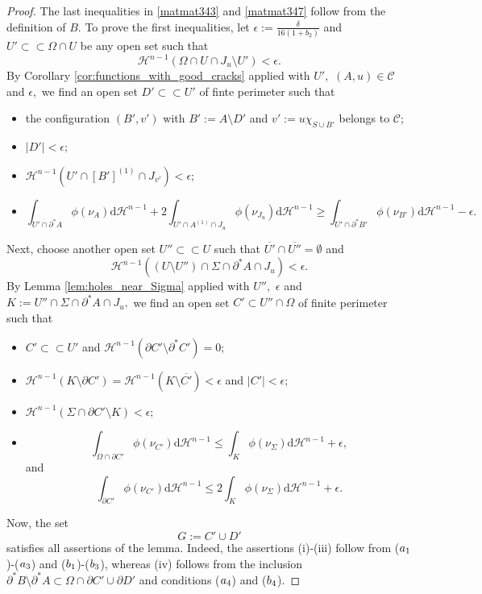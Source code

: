 \documentclass[reqno]{amsart}
\numberwithin{equation}{section}
\theoremstyle{plain}
\theoremstyle{definition}
\newcommand{\cH}{\mathcal{H}}
\newcommand{\p}{\partial}
\newcommand{\cl}[1]{\overline{#1}}
\newcommand{\bound}{b}
\renewcommand{\d}{\mathrm{d}}
\newcommand{\strictlyincluded}{\subset\subset}
\newcommand{\admissible}{\mathcal{C}}
\begin{document}
\begin{proof}
The last inequalities in \eqref{matmat343} and \eqref{matmat347} follow from the definition of $B.$
To prove the first inequalities, let $\epsilon:=\frac{\delta}{16(1+\bound_2)}$ and $U'\strictlyincluded \Omega\cap U$ be any open set such that
\begin{equation*}
\cH^{n-1}(\Omega\cap U\cap J_u\setminus U')<\epsilon.
\end{equation*}
By Corollary \ref{cor:functions_with_good_cracks} applied with $U',$ $(A,u)\in \admissible$ and $\epsilon,$ we find an open set $D'\strictlyincluded U'$ of finte perimeter such that
\begin{itemize}
 \item[($\rm a_1$)] the configuration $(B',v')$ with $B':=A\setminus D'$ and $v':=u\chi_{S\cup B'}$ belongs to $\admissible$;
 
 \item[($\rm a_2$)] $|D'|<\epsilon;$
 \item[($\rm a_3$)] $\cH^{n-1}(U'\cap [B']^{(1)} \cap J_{v'})<\epsilon;$
 \item[($\rm a_4$)] 
 $$
 \int_{U'\cap \p^*A}\phi(\nu_A)\d\cH^{n-1} + 2\int_{U'\cap A^{(1)}\cap J_u}\phi(\nu_{J_u})\d\cH^{n-1}
 \ge \int_{U'\cap \p^*B'}\phi(\nu_{B'})\d\cH^{n-1} -\epsilon.
 $$
\end{itemize}
Next, choose another open set $U''\strictlyincluded U$ such that $\cl{U'}\cap \cl{U''}=\emptyset$ and
%
\begin{equation*}
\cH^{n-1}((U\setminus U'')\cap \Sigma\cap \p^*A \cap J_u)< \epsilon. 
\end{equation*}
%
By Lemma \ref{lem:holes_near_Sigma} applied with $U'',$ $\epsilon$ and $K:=U''\cap \Sigma\cap\p^*A\cap J_u,$ we find an open set $C'\subset U''\cap \Omega$ of finite perimeter such that
%
\begin{itemize}
\item[($\rm b_1$)] $C'\strictlyincluded U'$ and $\cH^{n-1}(\p C'\setminus \p^*C')=0$; 

\item[($\rm b_2$)]  $\cH^{n-1}(K\setminus \p C') = \cH^{n-1}(K\setminus \cl{C'}) < \epsilon$ and $|C'|< \epsilon;$ 

\item[($\rm b_3$)]  $\cH^{n-1}(\Sigma\cap\p C'\setminus K) <\epsilon;$

\item[($\rm b_4$)]
 $$
 \int_{\Omega\cap \p C'} \phi(\nu_{C'})\d\cH^{n-1} \le \int_K \phi(\nu_\Sigma) \d\cH^{n-1} +\epsilon, 
 $$
 and 
 $$
 \int_{\p C'} \phi(\nu_{C'})\d\cH^{n-1} \le 2\int_K\phi(\nu_\Sigma) \d\cH^{n-1} +\epsilon.
 $$ 
\end{itemize}
%
Now, the set
$$
G:=C'\cup D'
$$
satisfies all assertions of the lemma. Indeed, the assertions (i)-(iii) follow  from ($\rm a_1$)-($\rm a_3$) and ($\rm b_1$)-($\rm b_3$), whereas (iv) follows from the inclusion
$\p^*B\setminus \p^*A\subset\Omega\cap  \p C'\cup \p D'$ and conditions ($\rm a_4$)  and ($\rm b_4$).
\end{proof}
 
\end{document}
